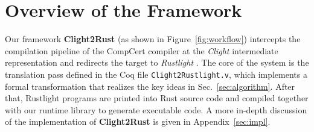 \documentclass{llncs} %
\begin{document}




\section{Overview of the Framework}
\label{sec:overview}

Our framework \textbf{Clight2Rust} (as shown in Figure~\ref{fig:workflow}) intercepts the compilation pipeline of the CompCert compiler \cite{Leroy2009} at the \emph{Clight} intermediate representation and redirects the target to \emph{Rustlight} \cite{Wu2025}. The core of the system is the translation pass defined in the Coq file \texttt{Clight2Rustlight.v}, which implements a formal transformation that realizes the key ideas in Sec.~\ref{sec:algorithm}. After that, Rustlight programs are printed into Rust source code and compiled together with our runtime library to generate executable code. A more in-depth discussion of the implementation of \textbf{Clight2Rust} is given in Appendix~\ref{sec:impl}.
\end{document}
